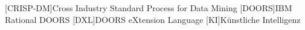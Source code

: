 
\begin{acronym}
	[CRISP-DM]{Cross Industry Standard Process for Data Mining}
	[DOORS]{IBM Rational DOORS}
	[DXL]{DOORS eXtension Language}
	[KI]{Künstliche Intelligenz}
\end{acronym}


